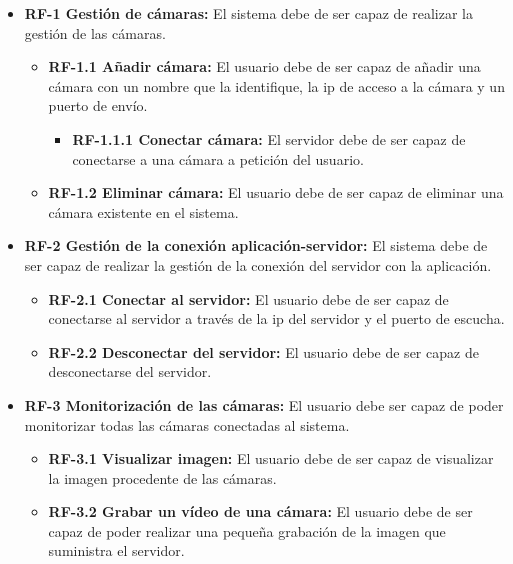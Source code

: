 \begin{itemize}
	\item 
		\textbf{RF-1 Gestión de cámaras:} 
			El sistema debe de ser capaz de realizar la gestión de las cámaras.
		\begin{itemize}
			\item \label{RF1-1}
				\textbf{RF-1.1 Añadir cámara:}
					El usuario debe de ser capaz de añadir una cámara con un nombre que la identifique, la ip de acceso a la cámara y un puerto de envío. 
					\begin{itemize}
						\item
							\textbf{RF-1.1.1 Conectar cámara:}
								El servidor debe de ser capaz de conectarse a una cámara a petición del usuario.
					\end{itemize}
			\item \label{RF1-2}
				\textbf{RF-1.2 Eliminar cámara:}
					El usuario debe de ser capaz de eliminar una cámara existente en el sistema.
		\end{itemize}
		
	\item
		\textbf{RF-2 Gestión de la conexión aplicación-servidor:} 
			El sistema debe de ser capaz de realizar la gestión de la conexión del servidor con la aplicación.
		\begin{itemize}
			\item \label{RF2-1}
				\textbf{RF-2.1 Conectar al servidor:}
					El usuario debe de ser capaz de conectarse al servidor a través de la ip del servidor y el puerto de escucha. 
			\item \label{RF2-2}
				\textbf{RF-2.2 Desconectar del servidor:}
					El usuario debe de ser capaz de desconectarse del servidor.
		\end{itemize}
		
	\item
		\textbf{RF-3 Monitorización de las cámaras:} 
			El usuario debe ser capaz de poder monitorizar todas las cámaras conectadas al sistema.
			\begin{itemize}
			\item \label{RF3-1}
				\textbf{RF-3.1 Visualizar imagen:}
					El usuario debe de ser capaz de visualizar la imagen procedente de las cámaras.
			\item
				\textbf{RF-3.2 Grabar un vídeo de una cámara:} 
					El usuario debe de ser capaz de poder realizar una pequeña grabación de la imagen que suministra el servidor.
		\end{itemize}
	

\end{itemize}
